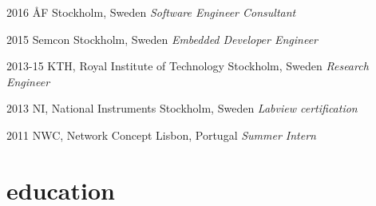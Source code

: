\documentclass[]{friggeri-cv}
\begin{document}
\begin{entrylist}
	\entry
	{2016}
	{ÅF}
	{Stockholm, Sweden}
	{\emph{Software Engineer Consultant}}
\end{entrylist}

\begin{entrylist}
	\entry
	{2015}
	{Semcon}
	{Stockholm, Sweden}
	{ \emph{Embedded Developer Engineer} }
\end{entrylist}

\begin{entrylist}
	\entry
	{2013-15}
	{KTH, Royal Institute of Technology}
	{Stockholm, Sweden}
	{\emph{Research Engineer}}

\end{entrylist}

\begin{entrylist}
	\entry
	{2013}
	{NI, National Instruments}
	{Stockholm, Sweden}
	{ \emph{Labview certification} }
\end{entrylist}

\begin{entrylist}
	\entry
	{2011}
	{NWC, Network Concept}
	{Lisbon, Portugal}
	{\emph{Summer Intern}}
\end{entrylist}

\section{education}
\end{document}
